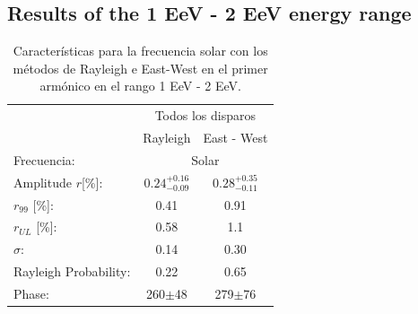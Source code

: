 \documentclass[11pt, letterpaper,oneside]{article}
\begin{document}
\subsection{Results of the 1 EeV - 2 EeV energy range}


\begin{table}[H]
    \begin{small}
        \begin{center}
            \begin{tabular}[c]{l|c|c|}
                \cline{2-3}         & \multicolumn{2}{c|}{Todos los disparos} \\ \cline{2-3}
                                        & Rayleigh                       & East - West            \\\hline
\multicolumn{1}{|l|}{Frecuencia:}       & \multicolumn{2}{c|}{Solar}        \\
\multicolumn{1}{|l|}{Amplitude $r$[\%]:} & $0.24^{+0.16}_{-0.09}$  & $0.28^{+0.35}_{-0.11}$ \\
\multicolumn{1}{|l|}{$r_{99}$ [\%]:   } & 0.41                    & 0.91       \\
\multicolumn{1}{|l|}{$r_{UL}$ [\%]:   } & 0.58                   & 1.1       \\
\multicolumn{1}{|l|}{$\sigma$:        } & 0.14                    & 0.30          \\\hline
\multicolumn{1}{|l|}{Rayleigh Probability:    } & 0.22                     & 0.65          \\
\multicolumn{1}{|l|}{Phase:            } & 260$\pm$48              & 279$\pm$76    \\\hline
            \end{tabular}
        \end{center}

    \end{small}
    \caption{Características para la frecuencia solar con los métodos de Rayleigh  e East-West en el primer armónico en el rango 1 EeV - 2 EeV.}
    \label{tab:solar_3}
\end{table}
\end{document}
